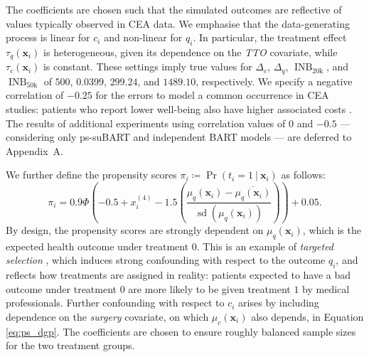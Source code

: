 \documentclass[aoas,preprint]{imsart}
\newcommand\given[1][]{\:#1\vert\:}
\theoremstyle{plain}
\theoremstyle{definition}
\theoremstyle{remark}
\begin{document}
The coefficients are chosen such that the simulated outcomes are reflective of values typically observed in CEA data. We emphasise that the data-generating process is linear for $c_i$ and non-linear for $q_i$. In particular, the treatment effect $\tau_q(\mathbf{x}_i)$ is heterogeneous, given its dependence on the \textit{TTO} covariate, while $\tau_c(\mathbf{x}_i)$ is constant. 
These settings imply true values for $\Delta_c$, $\Delta_q$, $\operatorname{INB}_{20\mathrm{k}}$, and $\operatorname{INB}_{50\mathrm{k}}$ of $500$, $0.0399$, $299.24$, and $1489.10$, respectively. We specify a negative correlation of $-0.25$ for the errors to model a common occurrence in CEA studies: patients who report lower well-being also have higher associated costs \citep{glick2014economic}.
The results of additional experiments using correlation values of $0$ and $-0.5$ --- considering only ps-suBART and independent BART models --- are deferred to Appendix~A.

We further define the propensity scores $\pi_i \coloneqq \Pr(t_i = 1 \given \mathbf{x}_i)$ as follows:
\begin{equation}
\pi_i = 0.9 \Phi\left(-0.5 + x^{(4)}_i -1.5\left(\frac{\mu_q(\mathbf{x}_i) - \overline{\mu_q(\mathbf{x}_i)}}{\operatorname{sd}(\mu_q(\mathbf{x}_i))}\right)\right) + 0.05.\label{eq:ps_dgp}
\end{equation}
By design, the propensity scores are strongly dependent on $\mu_q(\mathbf{x}_i)$, which is the expected health outcome under treatment $0$. This is an example of \textit{targeted selection} \citep{hahn2020bayesian}, which induces strong confounding with respect to the outcome $q_i$, and reflects how treatments are assigned in reality: patients expected to have a bad outcome under treatment $0$ are more likely to be given treatment $1$ by medical professionals. Further confounding with respect to $c_i$ arises by including dependence on the \textit{surgery} covariate, on which $\mu_c(\mathbf{x}_i)$ also depends, in Equation \eqref{eq:ps_dgp}. The coefficients are chosen to ensure roughly balanced sample sizes for the two treatment groups.
\end{document}
